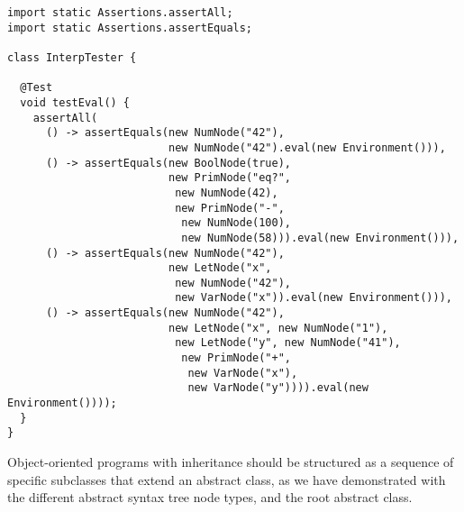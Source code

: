 \enlargethispage{-9\baselineskip}
\begin{lstlisting}[language=MyJava]
import static Assertions.assertAll;
import static Assertions.assertEquals;
  
class InterpTester {
  
  @Test
  void testEval() {
    assertAll(
      () -> assertEquals(new NumNode("42"),
                         new NumNode("42").eval(new Environment())),
      () -> assertEquals(new BoolNode(true),
                         new PrimNode("eq?",
                          new NumNode(42),
                          new PrimNode("-",
                           new NumNode(100),
                           new NumNode(58))).eval(new Environment())),
      () -> assertEquals(new NumNode("42"),
                         new LetNode("x", 
                          new NumNode("42"), 
                          new VarNode("x")).eval(new Environment())),
      () -> assertEquals(new NumNode("42"),
                         new LetNode("x", new NumNode("1"),
                          new LetNode("y", new NumNode("41"),
                           new PrimNode("+", 
                            new VarNode("x"), 
                            new VarNode("y")))).eval(new Environment())));
  }
}
\end{lstlisting}

Object-oriented programs with inheritance should be structured as a sequence of specific subclasses that extend an abstract class, as we have demonstrated with the different abstract syntax tree node types, and the root  abstract class. 

